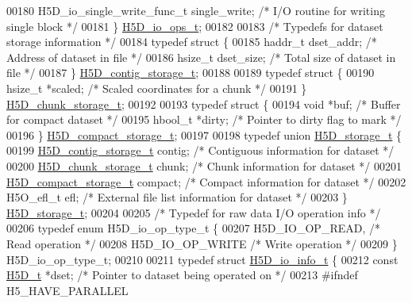 \begin{DoxyCode}
00180     H5D\_io\_single\_write\_func\_t single\_write;    \textcolor{comment}{/* I/O routine for writing single block */}
00181 \} \hyperlink{struct_h5_d__io__ops__t}{H5D\_io\_ops\_t};
00182 
00183 \textcolor{comment}{/* Typedefs for dataset storage information */}
00184 \textcolor{keyword}{typedef} \textcolor{keyword}{struct }\{
00185     haddr\_t dset\_addr;      \textcolor{comment}{/* Address of dataset in file */}
00186     hsize\_t dset\_size;      \textcolor{comment}{/* Total size of dataset in file */}
00187 \} \hyperlink{struct_h5_d__contig__storage__t}{H5D\_contig\_storage\_t};
00188 
00189 \textcolor{keyword}{typedef} \textcolor{keyword}{struct }\{
00190     hsize\_t *scaled;        \textcolor{comment}{/* Scaled coordinates for a chunk */}
00191 \} \hyperlink{struct_h5_d__chunk__storage__t}{H5D\_chunk\_storage\_t};
00192 
00193 \textcolor{keyword}{typedef} \textcolor{keyword}{struct }\{
00194     \textcolor{keywordtype}{void} *buf;              \textcolor{comment}{/* Buffer for compact dataset */}
00195     hbool\_t *dirty;         \textcolor{comment}{/* Pointer to dirty flag to mark */}
00196 \} \hyperlink{struct_h5_d__compact__storage__t}{H5D\_compact\_storage\_t};
00197 
00198 \textcolor{keyword}{typedef} \textcolor{keyword}{union }\hyperlink{union_h5_d__storage__t}{H5D\_storage\_t} \{
00199     \hyperlink{struct_h5_d__contig__storage__t}{H5D\_contig\_storage\_t} contig; \textcolor{comment}{/* Contiguous information for dataset */}
00200     \hyperlink{struct_h5_d__chunk__storage__t}{H5D\_chunk\_storage\_t} chunk;  \textcolor{comment}{/* Chunk information for dataset */}
00201     \hyperlink{struct_h5_d__compact__storage__t}{H5D\_compact\_storage\_t} compact; \textcolor{comment}{/* Compact information for dataset */}
00202     H5O\_efl\_t   efl;            \textcolor{comment}{/* External file list information for dataset */}
00203 \} \hyperlink{union_h5_d__storage__t}{H5D\_storage\_t};
00204 
00205 \textcolor{comment}{/* Typedef for raw data I/O operation info */}
00206 \textcolor{keyword}{typedef} \textcolor{keyword}{enum} H5D\_io\_op\_type\_t \{
00207     H5D\_IO\_OP\_READ,         \textcolor{comment}{/* Read operation */}
00208     H5D\_IO\_OP\_WRITE         \textcolor{comment}{/* Write operation */}
00209 \} H5D\_io\_op\_type\_t;
00210 
00211 \textcolor{keyword}{typedef} \textcolor{keyword}{struct }\hyperlink{struct_h5_d__io__info__t}{H5D\_io\_info\_t} \{
00212     \textcolor{keyword}{const} \hyperlink{struct_h5_d__t}{H5D\_t} *dset;          \textcolor{comment}{/* Pointer to dataset being operated on */}
00213 \textcolor{preprocessor}{#ifndef H5\_HAVE\_PARALLEL}

\end{DoxyCode}
